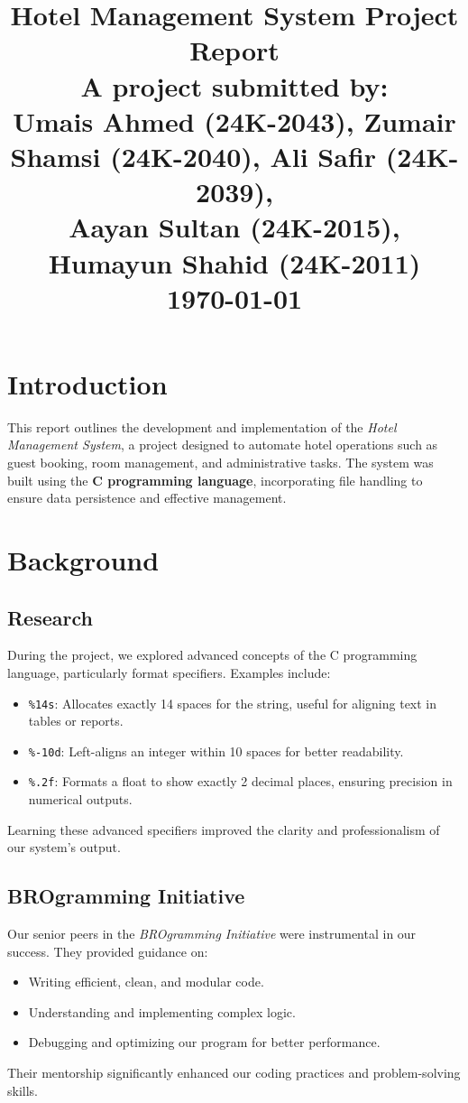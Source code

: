 \documentclass[12pt,a4paper]{article}
\title{
    \vspace{1in}
    \textbf{\Huge Hotel Management System Project Report}\\[1cm]
    \normalsize A project submitted by:\\[0.5cm]
    \large Umais Ahmed (24K-2043), Zumair Shamsi (24K-2040), Ali Safir (24K-2039),\\
    Aayan Sultan (24K-2015), Humayun Shahid (24K-2011)\\[1in]
    \textbf{\today}\\[1in]
}
\date{}
\author{}
\begin{document}
\maketitle
\newpage

\tableofcontents
\newpage

\section{Introduction}
This report outlines the development and implementation of the \textit{Hotel Management System}, a project designed to automate hotel operations such as guest booking, room management, and administrative tasks. The system was built using the \textbf{C programming language}, incorporating file handling to ensure data persistence and effective management.

\section{Background}
\subsection{Research}
During the project, we explored advanced concepts of the C programming language, particularly format specifiers. Examples include:
\begin{itemize}
    \item \verb|%14s|: Allocates exactly 14 spaces for the string, useful for aligning text in tables or reports.
    \item \verb|%-10d|: Left-aligns an integer within 10 spaces for better readability.
    \item \verb|%.2f|: Formats a float to show exactly 2 decimal places, ensuring precision in numerical outputs.
\end{itemize}
Learning these advanced specifiers improved the clarity and professionalism of our system's output.

\subsection{BROgramming Initiative}
Our senior peers in the \textit{BROgramming Initiative} were instrumental in our success. They provided guidance on:
\begin{itemize}
    \item Writing efficient, clean, and modular code.
    \item Understanding and implementing complex logic.
    \item Debugging and optimizing our program for better performance.
\end{itemize}
Their mentorship significantly enhanced our coding practices and problem-solving skills.
\newpage
\end{document}
